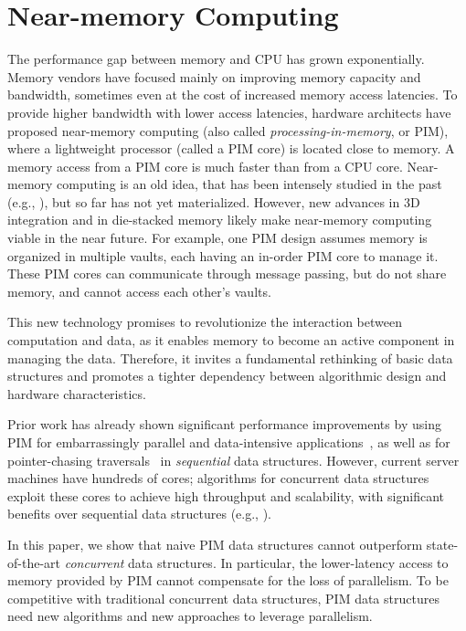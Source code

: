 \section{Near-memory Computing}

The performance gap between memory and CPU has grown exponentially. Memory vendors have focused mainly on improving memory capacity and bandwidth, sometimes even at the cost of increased memory access latencies. To provide higher bandwidth with lower access latencies, hardware architects have proposed near-memory computing (also called \textit{processing-in-memory}, or PIM), where a lightweight processor (called a PIM core) is located close to memory. A memory access from a PIM core is much faster than from a CPU core. 
Near-memory computing is an old idea, that has been intensely studied in the past 
(e.g., \cite{Stone1970, Kogge1994, Gokhale1995, Patterson1997, Oskin1998, KangHYKGLTP99, Hall1999}), 
but so far has not yet materialized. However, new advances in 3D integration and in die-stacked memory 
likely make near-memory computing viable in the near future. 
For example, one PIM design assumes memory is organized in multiple vaults, each having an in-order PIM core to manage it. These PIM cores
can communicate through message passing, but do not share memory, and cannot access each other's vaults. 

This new technology promises to revolutionize the interaction between computation and data, 
as it enables memory to become an active component in managing the data. 
Therefore, it invites a fundamental rethinking of basic data structures and promotes a tighter dependency between algorithmic design and hardware characteristics. 

Prior work has already shown significant performance improvements by using PIM for embarrassingly parallel 
and data-intensive applications~\cite{Zhang2014:TTP, Ahn2015:2, ZhuASSHPF13, Akin2015:DRM}, 
as well as for pointer-chasing traversals~\cite{hsieh2016accelerating} in \emph{sequential} data structures. 
However, current server machines have hundreds of cores; 
algorithms for concurrent data structures exploit these cores to achieve high throughput and scalability, 
with significant benefits over sequential data structures 
(e.g., \cite{practicallf, skiplists-concpugh, valois, Herlihy08}). 

In this paper, we show that naive PIM data structures cannot outperform 
state-of-the-art \emph{concurrent} data structures. 
In particular, the lower-latency access to memory provided by PIM cannot compensate 
for the loss of parallelism. 
To be competitive with traditional concurrent data structures, 
PIM data structures need new algorithms and new approaches to leverage parallelism.  

